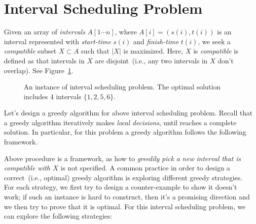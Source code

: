 \setcounter{definition}{0} \setcounter{property}{0} \setcounter{claim}{0} \setcounter{fact}{0} \setcounter{corollary}{0} \setcounter{figure}{0}
\section{Interval Scheduling Problem}

Given an array of \emph{intervals} $A[1\cdots n]$, where $A[i] = (s(i),t(i))$ is an interval represented with
\emph{start-time} $s(i)$ and \emph{finish-time} $t(i)$, we seek a \emph{compatible} subset $X\subset A$
such that $|X|$ is maximized. Here, $X$ is \emph{compatible} is defined as that intervals in $X$
are disjoint~(i.e., any two intervals in $X$ don't overlap).
See Figure~\ref{fig:interval}.

\begin{figure}[h]
\centering{}
\caption{An instance of interval scheduling problem.
The optimal solution includes 4 intervals $\{1, 2, 5, 6\}$.}
\label{fig:interval}
\end{figure}

Let's design a greedy algorithm for above interval scheduling problem.
Recall that a greedy algorithm iteratively makes \emph{local decisions},
until reaches a complete solution. In particular, for this problem
a greedy algorithm follows the following framework.

\begin{minipage}{0.8\textwidth}
	\xxx
	\xxx
	\xxx
	\xxx
	\xxx
	\xxx
	\xxx
\end{minipage}

Above procedure is a framework, as how to \emph{greedily pick a new interval that is compatible with $X$} is not specified.
A common practice in order to design a correct~(i.e., optimal) greedy algorithm is
exploring different greedy strategies. For each strategy, we first try to
design a counter-example to show it doesn't work; if such an instance
is hard to construct, then it's a promising direction and we then try to prove that it is optimal.
For this interval scheduling problem, we can explore the following strategies:

